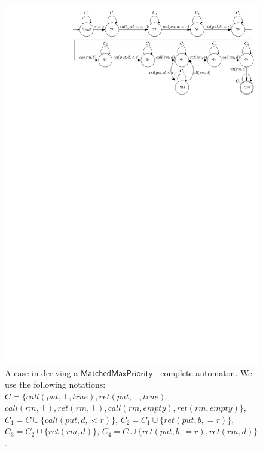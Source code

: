 \begin{figure}[htbp]
  \centering
  \includegraphics[width=0.8 \textwidth]{figures/PIC-WitnessAutomata-For1.pdf}
  \caption{A case in deriving a $\mathsf{MatchedMaxPriority}^{=}$-complete automaton. We use the following notations: $C = \{ \textit{call}(\textit{put},\top,\textit{true}),\textit{ret}(\textit{put},\top,\textit{true})$, $\textit{call}(\textit{rm},\top), \textit{ret}(\textit{rm},\top),\textit{call}(\textit{rm},\textit{empty}),\textit{ret}(\textit{rm},\textit{empty}) \}$, $C_1 = C \cup \{ \textit{call}(\textit{put},d,<r) \}$, $C_2 = C_1 \cup \{ \textit{ret}(\textit{put},b,=r) \}$, $C_3 = C_2 \cup \{ \textit{ret}(\textit{rm},d) \}$, $C_4 = C \cup \{ \textit{ret}(\textit{put},b,=r), \textit{ret}(\textit{rm},d) \}$.}
  \label{fig:an enumeration and its witness automaton}
\end{figure}



